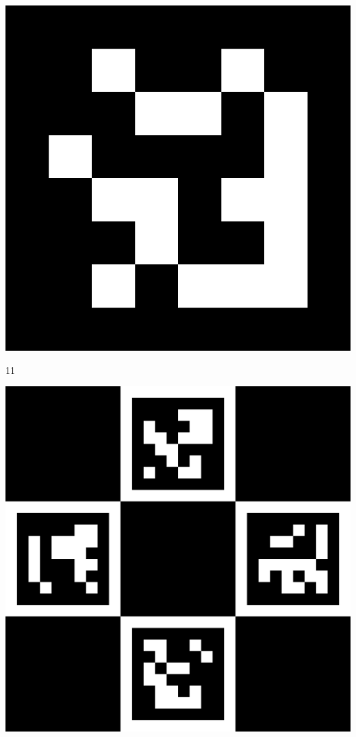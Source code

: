 \newpage
\myemptypage
\vspace{5cm}
\begin{center}
\includegraphics[width=\textwidth, keepaspectratio]{aruco_11.png}
\caption{11}
\end{center}
\newpage
\myemptypage
\vspace{5cm}
\begin{center}
\includegraphics[width=\textwidth, keepaspectratio]{caruco_board.png}
\end{center}
\newpage
\myemptypage
